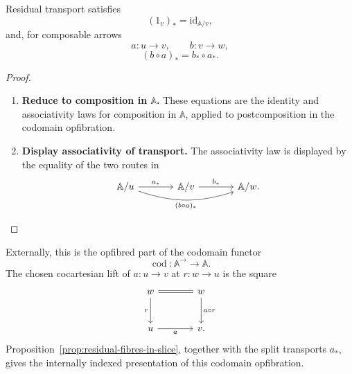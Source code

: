 \begin{proposition}
\label{prop:residual-transport-laws}
    Residual transport satisfies
    \[
        (1_v)_*=\mathrm{id}_{\mathbb A/v},
    \]
    and, for composable arrows
    \[
        a:u\to v,
        \qquad
        b:v\to w,
    \]
    \[
        (b\circ a)_*=b_*\circ a_*.
    \]
\end{proposition}
\begin{proof}
    \leavevmode
    \begin{enumerate}
        \item \textbf{Reduce to composition in \(\mathbb A\).} These equations are the identity and associativity laws for composition in \(\mathbb A\), applied to postcomposition in the codomain opfibration.

        \item \textbf{Display associativity of transport.} The associativity law is displayed by the equality of the two routes in
        \[
            \begin{tikzcd}[column sep=large, row sep=large]
                    \mathbb A/u
                        \arrow[r, "a_*"]
                        \arrow[rr, "{(b\circ a)_*}"', bend right=18]
                &
                    \mathbb A/v
                        \arrow[r, "b_*"]
                &
                    \mathbb A/w.
            \end{tikzcd}
        \]
    \end{enumerate}
\end{proof}

\begin{remark}
\label{rem:codomain-opfibration}
    Externally, this is the opfibred part of the codomain functor
    \[
        \operatorname{cod}:\mathbb A^\to\to\mathbb A.
    \]
    The chosen cocartesian lift of \(a:u\to v\) at \(r:w\to u\) is the square
    \[
        \begin{tikzcd}[column sep=large, row sep=large]
                w
                    \arrow[r, equal]
                    \arrow[d, "r"']
            &
                w
                    \arrow[d, "a\circ r"]
            \\
                u
                    \arrow[r, "a"']
            &
                v.
        \end{tikzcd}
    \]
    Proposition~\ref{prop:residual-fibres-in-slice}, together with the split transports \(a_*\), gives the internally indexed presentation of this codomain opfibration.
\end{remark}

